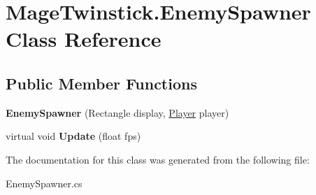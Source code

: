 \hypertarget{class_mage_twinstick_1_1_enemy_spawner}{}\section{Mage\+Twinstick.\+Enemy\+Spawner Class Reference}
\label{class_mage_twinstick_1_1_enemy_spawner}
\subsection*{Public Member Functions}
\begin{DoxyCompactItemize}
\item 
\hypertarget{class_mage_twinstick_1_1_enemy_spawner_abd353f77aec752709c47a110a15a1bb2}{}{\bfseries Enemy\+Spawner} (Rectangle display, \hyperlink{class_mage_twinstick_1_1_player}{Player} player)\label{class_mage_twinstick_1_1_enemy_spawner_abd353f77aec752709c47a110a15a1bb2}

\item 
\hypertarget{class_mage_twinstick_1_1_enemy_spawner_a4e22661d16cc2c9671eefe32fda8a42e}{}virtual void {\bfseries Update} (float fps)\label{class_mage_twinstick_1_1_enemy_spawner_a4e22661d16cc2c9671eefe32fda8a42e}

\end{DoxyCompactItemize}


The documentation for this class was generated from the following file\+:\begin{DoxyCompactItemize}
\item 
Enemy\+Spawner.\+cs\end{DoxyCompactItemize}
